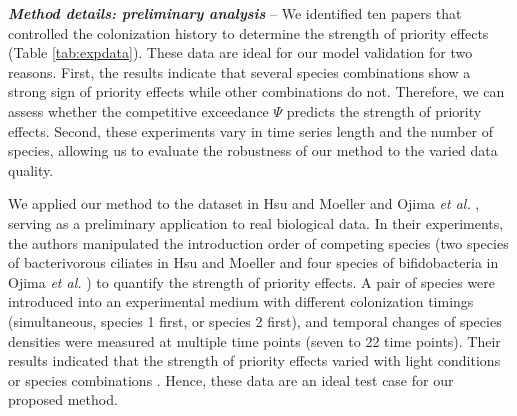 \documentclass[12pt, class=article, crop=false]{standalone}
\begin{document}
\textit{\textbf{Method details: preliminary analysis}} --
We identified ten papers that controlled the colonization history to determine the strength of priority effects (Table \ref{tab:expdata}).
These data are ideal for our model validation for two reasons.
First, the results indicate that several species combinations show a strong sign of priority effects while other combinations do not.
Therefore, we can assess whether the competitive exceedance $\Psi$ predicts the strength of priority effects.
Second, these experiments vary in time series length and the number of species, allowing us to evaluate the robustness of our method to the varied data quality.

We applied our method to the dataset in Hsu and Moeller \citep{hsu_metabolic_2021} and Ojima \textit{et al.} \citep{ojima_priority_2022}, serving as a preliminary application to real biological data.
In their experiments, the authors manipulated the introduction order of competing species (two species of bacterivorous ciliates in Hsu and Moeller \citep{hsu_metabolic_2021} and four species of bifidobacteria in Ojima \textit{et al.} \citep{ojima_priority_2022}) to quantify the strength of priority effects.
A pair of species were introduced into an experimental medium with different colonization timings (simultaneous, species 1 first, or species 2 first), and temporal changes of species densities were measured at multiple time points (seven to 22 time points).
Their results indicated that the strength of priority effects varied with light conditions \citep{hsu_metabolic_2021} or species combinations \citep{ojima_priority_2022}.
Hence, these data are an ideal test case for our proposed method.
\end{document}
